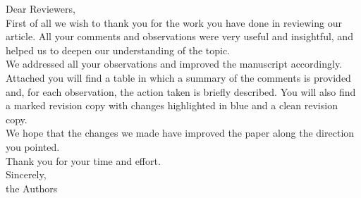\documentclass{article}
\begin{document}
Dear Reviewers,\\

First of all we wish to thank you for the work you have done in reviewing our article. All your comments and observations were very useful and insightful, and helped us to deepen our understanding of the topic. \\

We addressed all your observations and improved the manuscript accordingly. Attached you will find a table in which a summary of the comments is provided and, for each observation, the action taken is briefly described. You will also find a marked revision copy with changes highlighted in blue and a clean revision copy.\\

We hope that the changes we made have improved the paper along the direction you pointed.\\

Thank you for your time and effort.\\

Sincerely,\\

the Authors
\end{document}
